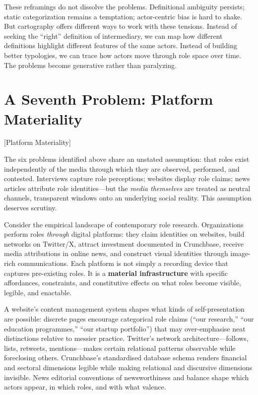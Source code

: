 \documentclass[../main.tex]{subfiles}
\begin{document}
These reframings do not dissolve the problems. Definitional ambiguity persists; static categorization remains a temptation; actor-centric bias is hard to shake. But cartography offers different ways to work with these tensions. Instead of seeking the ``right'' definition of intermediary, we can map how different definitions highlight different features of the same actors. Instead of building better typologies, we can trace how actors move through role space over time. The problems become generative rather than paralyzing.


\section{A Seventh Problem: Platform Materiality}[Platform Materiality]

The six problems identified above share an unstated assumption: that roles exist independently of the media through which they are observed, performed, and contested. Interviews capture role perceptions; websites display role claims; news articles attribute role identities---but the \emph{media themselves} are treated as neutral channels, transparent windows onto an underlying social reality. This assumption deserves scrutiny.

Consider the empirical landscape of contemporary role research. Organizations perform roles \emph{through} digital platforms: they claim identities on websites, build networks on Twitter/X, attract investment documented in Crunchbase, receive media attributions in online news, and construct visual identities through image-rich communications. Each platform is not simply a recording device that captures pre-existing roles. It is a \textbf{material infrastructure} with specific affordances, constraints, and constitutive effects on what roles become visible, legible, and enactable.

A website's content management system shapes what kinds of self-presentation are possible: discrete pages encourage categorical role claims (``our research,'' ``our education programmes,'' ``our startup portfolio'') that may over-emphasise neat distinctions relative to messier practice. Twitter's network architecture---follows, lists, retweets, mentions---makes certain relational patterns observable while foreclosing others. Crunchbase's standardised database schema renders financial and sectoral dimensions legible while making relational and discursive dimensions invisible. News editorial conventions of newsworthiness and balance shape which actors appear, in which roles, and with what valence.
\end{document}
